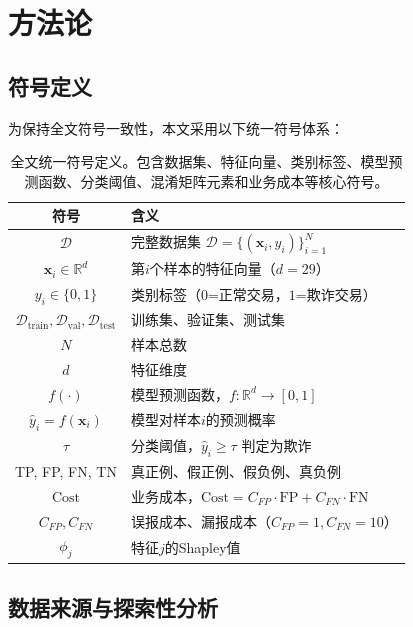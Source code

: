 
\section{方法论}

\subsection{符号定义}

为保持全文符号一致性，本文采用以下统一符号体系：

\begin{table}[H]
\centering
\caption{全文统一符号定义。包含数据集、特征向量、类别标签、模型预测函数、分类阈值、混淆矩阵元素和业务成本等核心符号。}
\label{tab:notation}
\begin{tabular}{cl}
\toprule
\textbf{符号} & \textbf{含义} \\
\midrule
$\mathcal{D}$ & 完整数据集 $\mathcal{D} = \{(\mathbf{x}_i, y_i)\}_{i=1}^{N}$ \\
$\mathbf{x}_i \in \mathbb{R}^d$ & 第$i$个样本的特征向量（$d=29$） \\
$y_i \in \{0, 1\}$ & 类别标签（$0$=正常交易，$1$=欺诈交易） \\
$\mathcal{D}_{\text{train}}, \mathcal{D}_{\text{val}}, \mathcal{D}_{\text{test}}$ & 训练集、验证集、测试集 \\
$N$ & 样本总数 \\
$d$ & 特征维度 \\
$f(\cdot)$ & 模型预测函数，$f: \mathbb{R}^d \to [0, 1]$ \\
$\hat{y}_i = f(\mathbf{x}_i)$ & 模型对样本$i$的预测概率 \\
$\tau$ & 分类阈值，$\hat{y}_i \geq \tau$ 判定为欺诈 \\
TP, FP, FN, TN & 真正例、假正例、假负例、真负例 \\
$\text{Cost}$ & 业务成本，$\text{Cost} = C_{FP} \cdot \text{FP} + C_{FN} \cdot \text{FN}$ \\
$C_{FP}, C_{FN}$ & 误报成本、漏报成本（$C_{FP}=1, C_{FN}=10$） \\
$\phi_j$ & 特征$j$的Shapley值 \\
\bottomrule
\end{tabular}
\end{table}

\subsection{数据来源与探索性分析}

